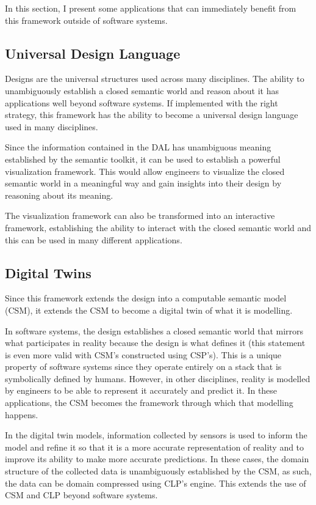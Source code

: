 In this section, I present some applications that can immediately benefit from this framework outside of software systems.

\subsection{Universal Design Language}

Designs are the universal structures used across many disciplines. The ability to unambiguously establish a closed semantic world and reason about it has applications well beyond software systems. If implemented with the right strategy, this framework has the ability to become a universal design language used in many disciplines.

Since the information contained in the DAL has unambiguous meaning established by the semantic toolkit, it can be used to establish a powerful visualization framework. This would allow engineers to visualize the closed semantic world in a meaningful way and gain insights into their design by reasoning about its meaning.

The visualization framework can also be transformed into an interactive framework, establishing the ability to interact with the closed semantic world and this can be used in many different applications.

\subsection{Digital Twins}

Since this framework extends the design into a computable semantic model (CSM), it extends the CSM to become a digital twin of what it is modelling.

In software systems, the design establishes a closed semantic world that mirrors what participates in reality because the design is what defines it (this statement is even more valid with CSM's constructed using CSP's). This is a unique property of software systems since they operate entirely on a stack that is symbolically defined by humans. However, in other disciplines, reality is modelled by engineers to be able to represent it accurately and predict it. In these applications, the CSM becomes the framework through which that modelling happens. 

In the digital twin models, information collected by sensors is used to inform the model and refine it so that it is a more accurate representation of reality and to improve its ability to make more accurate predictions. In these cases, the domain structure of the collected data is unambiguously established by the CSM, as such, the data can be domain compressed using CLP's engine. This extends the use of CSM and CLP beyond software systems. 

